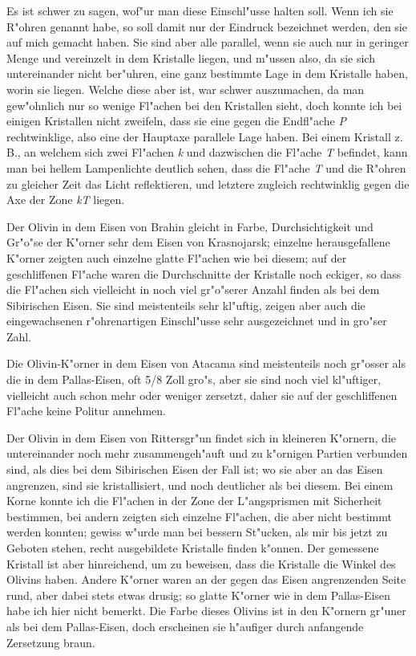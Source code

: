 \documentclass[a4paper, 11pt, oneside]{article}
\begin{document}
Es ist schwer zu sagen, wof"ur man diese Einschl"usse halten soll. Wenn ich sie R"ohren genannt habe, so soll damit nur der Eindruck bezeichnet werden, den sie auf mich gemacht haben. Sie sind aber alle parallel, wenn sie auch nur in geringer Menge und vereinzelt in dem Kristalle liegen, und m"ussen also, da sie sich untereinander nicht ber"uhren, eine ganz bestimmte Lage in dem Kristalle haben, worin sie liegen. Welche diese aber ist, war schwer auszumachen, da man gew"ohnlich nur so wenige Fl"achen bei den Kristallen sieht, doch konnte ich bei einigen Kristallen nicht zweifeln, dass sie eine gegen die Endfl"ache \emph{P} rechtwinklige, also eine der Hauptaxe parallele Lage haben. Bei einem Kristall z. B., an welchem sich zwei Fl"achen \emph{k} und dazwischen die Fl"ache \emph{T} befindet, kann man bei hellem Lampenlichte deutlich sehen, dass die Fl"ache \emph{T} und die R"ohren zu gleicher Zeit das Licht reflektieren, und letztere zugleich rechtwinklig gegen die Axe der Zone \emph{kT} liegen.

Der Olivin in dem Eisen von Brahin gleicht in Farbe, Durchsichtigkeit und Gr"o"se der K"orner sehr dem Eisen von Krasnojarsk; einzelne herausgefallene K"orner zeigten auch einzelne glatte Fl"achen wie bei diesem; auf der geschliffenen Fl"ache waren die Durchschnitte der Kristalle noch eckiger, so dass die Fl"achen sich vielleicht in noch viel gr"o"serer Anzahl finden als bei dem Sibirischen Eisen. Sie sind meistenteils sehr kl"uftig, zeigen aber auch die eingewachsenen r"ohrenartigen Einschl"usse sehr ausgezeichnet und in gro"ser Zahl.

Die Olivin-K"orner in dem Eisen von Atacama sind meistenteils noch gr"osser als die in dem Pallas-Eisen, oft 5/8 Zoll gro"s, aber sie sind noch viel kl"uftiger, vielleicht auch schon mehr oder weniger zersetzt, daher sie auf der geschliffenen Fl"ache keine Politur annehmen.

Der Olivin in dem Eisen von Rittersgr"un findet sich in kleineren K"ornern, die untereinander noch mehr zusammengeh"auft und zu k"ornigen Partien verbunden sind, als dies bei dem Sibirischen Eisen der Fall ist; wo sie aber an das Eisen angrenzen, sind sie kristallisiert, und noch deutlicher als bei diesem. Bei einem Korne konnte ich die Fl"achen in der Zone der L"angsprismen mit Sicherheit bestimmen, bei andern zeigten sich einzelne Fl"achen, die aber nicht bestimmt werden konnten; gewiss w"urde man bei bessern St"ucken, als mir bis jetzt zu Geboten stehen, recht ausgebildete Kristalle finden k"onnen. Der gemessene Kristall ist aber hinreichend, um zu beweisen, dass die Kristalle die Winkel des Olivins haben. Andere K"orner waren an der gegen das Eisen angrenzenden Seite rund, aber dabei stets etwas drusig; so glatte K"orner wie in dem Pallas-Eisen habe ich hier nicht bemerkt. Die Farbe dieses Olivins ist in den K"ornern gr"uner als bei dem Pallas-Eisen, doch erscheinen sie h"aufiger durch anfangende Zersetzung braun.
\end{document}
